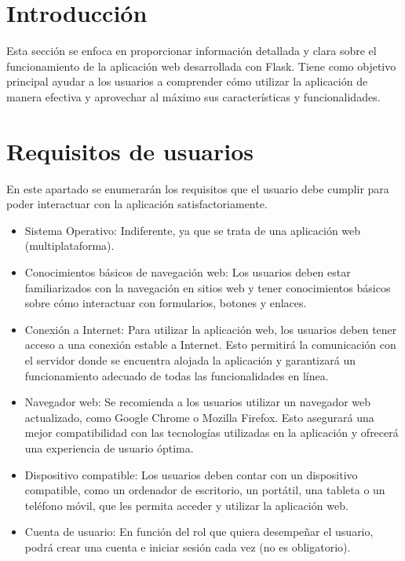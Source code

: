 
\section{Introducción}
Esta sección se enfoca en proporcionar información detallada y clara sobre el funcionamiento de la aplicación web desarrollada con Flask. Tiene como objetivo principal ayudar a los usuarios a comprender cómo utilizar la aplicación de manera efectiva y aprovechar al máximo sus características y funcionalidades.

\section{Requisitos de usuarios}
En este apartado se enumerarán los requisitos que el usuario debe cumplir para poder interactuar con la aplicación satisfactoriamente.

\begin{itemize}
    \item Sistema Operativo: Indiferente, ya que se trata de una aplicación web (multiplataforma).
    
    \item Conocimientos básicos de navegación web: Los usuarios deben estar familiarizados con la navegación en sitios web y tener conocimientos básicos sobre cómo interactuar con formularios, botones y enlaces.
    
    \item Conexión a Internet: Para utilizar la aplicación web, los usuarios deben tener acceso a una conexión estable a Internet. Esto permitirá la comunicación con el servidor donde se encuentra alojada la aplicación y garantizará un funcionamiento adecuado de todas las funcionalidades en línea.

    \item Navegador web: Se recomienda a los usuarios utilizar un navegador web actualizado, como Google Chrome o Mozilla Firefox. Esto asegurará una mejor compatibilidad con las tecnologías utilizadas en la aplicación y ofrecerá una experiencia de usuario óptima.
    
    \item Dispositivo compatible: Los usuarios deben contar con un dispositivo compatible, como un ordenador de escritorio, un portátil, una tableta o un teléfono móvil, que les permita acceder y utilizar la aplicación web.
    
    \item Cuenta de usuario: En función del rol que quiera desempeñar el usuario, podrá crear una cuenta e iniciar sesión cada vez (no es obligatorio).

\end{itemize}


